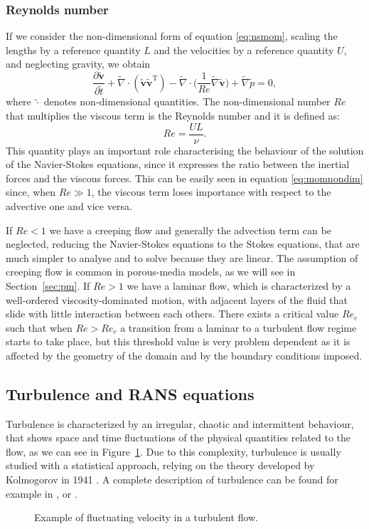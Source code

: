 \subsubsection{Reynolds number}
If we consider the non-dimensional form of equation \eqref{eq:nsmom}, scaling 
the lengths by a reference quantity $L$ and the velocities by a reference 
quantity $U$, and neglecting gravity, we obtain
\begin{equation} \label{eq:momnondim}
	\frac{\partial{\tilde{\mathbf{v}}}}{\partial \tilde{t}} + \tilde{\nabla} 
	\cdot (\tilde{\mathbf{v}} \tilde{\mathbf{v}}^\mathrm{T}) - \tilde{\nabla} 
	\cdot \bigg(\frac{1}{Re} \tilde{\nabla} \tilde{\mathbf{v}}\bigg) + 
	\tilde{\nabla} 
	\tilde{p} = 0,
\end{equation}
where $\tilde{\cdot}$ denotes non-dimensional quantities. The non-dimensional number $Re$ that multiplies the viscous term is the 
Reynolds number and it is defined as:
\begin{equation}
Re = \frac{UL}{\nu}.
\end{equation}
This quantity plays an important role characterising the behaviour of the solution of the 
Navier-Stokes equations, since it expresses the ratio between the inertial forces 
and the viscous forces. This can be easily seen in equation 
\eqref{eq:momnondim} since, when $Re\gg 1$, the viscous term loses 
importance with respect to the advective one and vice versa.

If $Re < 1$ we have a creeping flow and generally the advection term can 
be neglected, reducing the Navier-Stokes equations to the Stokes equations, 
that are much simpler to analyse and to solve because they are linear. The 
assumption of creeping flow is common in porous-media models, as we will 
see in Section~\ref{sec:pm}. If $Re>1$ we have a laminar flow, which is 
characterized by a well-ordered viscosity-dominated motion, with adjacent 
layers of the fluid that slide with little interaction between each others.
There exists a critical value $Re_c$ such that when $Re>Re_c$ a 
transition from a laminar to a turbulent flow regime starts to take place, but 
this threshold value is very problem dependent as it is affected by the 
geometry of the domain and by the boundary conditions imposed.
%
\subsection{Turbulence and RANS equations}
Turbulence is characterized by an irregular, chaotic and intermittent 
behaviour, that shows space and time fluctuations of the physical quantities 
related to the flow, as we can see in Figure~\ref{fig:fluctuations}. Due to 
this complexity, turbulence is usually studied with 
a statistical approach, relying on the theory developed by Kolmogorov 
in 1941 \cite{turbo:kolmogorov}. A complete description of turbulence can be 
found for example in \cite{main:pope}, \cite{main:wilcox} or 
\cite{main:davidson}.
\begin{figure}[ht]
	\centering
	
	\caption[Fluctuating velocity in a turbulent flow]{Example of fluctuating 
	velocity in a turbulent flow.} %
	\label{fig:fluctuations}
\end{figure}

